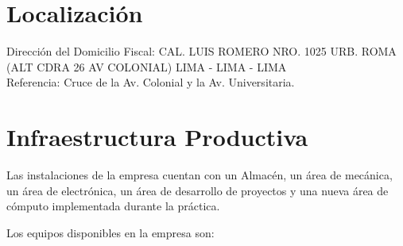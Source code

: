 \section{Localización}
Dirección del Domicilio Fiscal: CAL. LUIS ROMERO NRO. 1025 URB. ROMA (ALT CDRA 26 AV COLONIAL) LIMA - LIMA - LIMA \\
Referencia: Cruce de la Av. Colonial y la Av. Universitaria.


\section{Infraestructura Productiva}

Las instalaciones de la empresa cuentan con un Almacén, un área de mecánica, un área de electrónica, un área de desarrollo de proyectos y una nueva área de cómputo implementada durante la práctica.

Los equipos disponibles en la empresa son:

